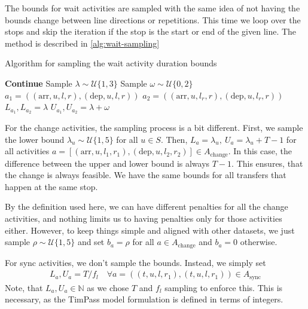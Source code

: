 \documentclass[english, 12pt, a4paper, sci, utf8, a-2b, online]{aaltothesis}
\newcommand{\N}{\mathbb{N}}
\newcommand{\Async}{A_\text{sync}}
\newcommand{\unif}[1]{\mathcal{U}\{#1\}}
\begin{document}
The bounds for wait activities are sampled with the same idea of not having the bounds change between line directions or repetitions. This time we loop over the stops and skip the iteration if the stop is the start or end of the given line. The method is described in \cref{alg:wait-sampling}

\begin{algorithm}

    \caption{Algorithm for sampling the wait activity duration bounds}
    \label{alg:wait-sampling}
    \begin{algorithmic}
                    \State \textbf{Continue}
                \EndIf
                \State Sample $\lambda \sim \unif{1, 3}$ 
                \State Sample $\omega \sim \unif{0, 2}$ 
                    \State $a_1 = ((\text{arr}, u, l, r), (\text{dep}, u, l, r))$ 
                    \State $a_2 = ((\text{arr}, u, l_r, r), (\text{dep}, u, l_r, r))$ 
                    \State $L_{a_1}, L_{a_2} = \lambda$
                    \State $U_{a_1}, U_{a_2} = \lambda + \omega$
                \EndFor
            \EndFor
        \EndFor
    \end{algorithmic}
    
\end{algorithm}

For the change activities, the sampling process is a bit different. First, we sample the lower bound $\lambda_u \sim \unif{1, 5}$ for all $ u \in S$. Then, $L_a = \lambda_u,\ U_a = \lambda_u + T - 1$ for all activities $a = [(\text{arr}, u, l_1, r_1), (\text{dep}, u, l_2, r_2)] \in A_\text{change}$. In this case, the difference between the upper and lower bound is always $T-1$. This ensures, that the change is always feasible. We have the same bounds for all transfers that happen at the same stop.

By the definition used here, we can have different penalties for all the change activities, and nothing limits us to having penalties only for those activities either. However, to keep things simple and aligned with other datasets, we just sample $\rho \sim \unif{1, 5}$ and set $b_a = \rho$ for all $a \in A_\text{change}$ and $b_a = 0$ otherwise.

For sync activities, we don't sample the bounds. Instead, we simply set
\begin{align}
    L_a, U_a = T / f_l\quad  \forall a = ((t, u, l, r_1), (t, u, l, r_1)) \in \Async
\end{align}
Note, that $L_a, U_a \in \N$ as we chose $T$ and $f_l$ sampling to enforce this. This is necessary, as the TimPass model formulation is defined in terms of integers.
\end{document}
